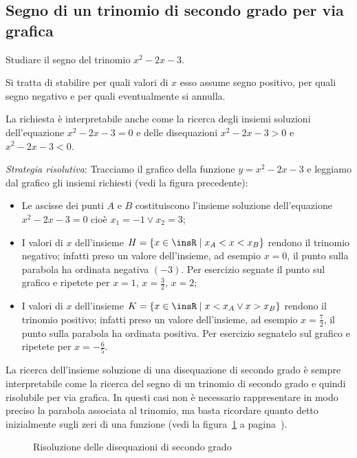 \subsection{Segno di un trinomio di secondo grado per via grafica}

\begin{exrig}
\begin{esempio}
Studiare il segno del trinomio $x^2-2x-3$.

Si tratta di stabilire per quali valori di $x$ esso assume segno positivo, per quali segno negativo e per quali eventualmente si annulla.

La richiesta è interpretabile anche come la ricerca degli insiemi soluzioni dell'equazione $x^2-2x-3=0$ e delle disequazioni $x^2-2x-3>0$ e $x^2-2x-3<0$.

\emph{Strategia risolutiva}:
Tracciamo il grafico della funzione $y=x^2-2x-3$ e leggiamo dal grafico gli insiemi richiesti (vedi la figura precedente):
\begin{itemize}
\item Le ascisse dei punti $A$ e $B$ costituiscono l'insieme soluzione dell'equazione $x^2-2x-3=0$ cioè $x_1=-1\vee x_2=3$;
\item I valori di $x$ dell'insieme $H=\{x\in \insR \mid x_A<x<x_B\}$ rendono il trinomio negativo; infatti preso un valore dell'insieme, ad esempio $x=0$, il punto sulla parabola ha ordinata negativa $(-3)$. Per esercizio segnate il punto sul grafico e ripetete per $x=1$, $x=\frac 3 2$, $x=2$;
\item I valori di $x$ dell'insieme $K=\{x\in \insR \mid x<x_A\vee x>x_B\}$ rendono il trinomio positivo; infatti preso un valore dell'insieme, ad esempio $x=\frac 7 2$, il punto sulla parabola ha ordinata positiva. Per esercizio segnatelo sul grafico e ripetete per $x=-\frac{6}{5}$.
\end{itemize}
\end{esempio}
\end{exrig}
\osservazione La ricerca dell'insieme soluzione di una disequazione di secondo grado è sempre interpretabile come la ricerca del segno di un trinomio di secondo grado e quindi risolubile per via grafica. In questi casi non è necessario rappresentare in modo preciso la parabola associata al trinomio, ma basta ricordare quanto detto inizialmente sugli zeri di una funzione (vedi la figura~\ref{fig:subfig10} a pagina~\pageref{fig:subfig10}).

\begin{figure}[tp]
\centering

\vspace{12pt}
{}
\vspace{12pt}
{}
\vspace{12pt}
{}
\vspace{12pt}
{}
\vspace{12pt}
{}
\caption{Risoluzione delle disequazioni di secondo grado}
\label{fig:subfig10}
\end{figure}

